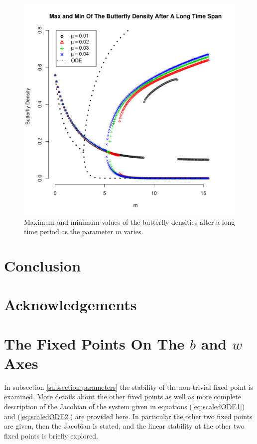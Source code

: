 \documentclass[12pt]{article}
\begin{document}
\begin{figure}[htb]
  \centering
  \includegraphics[width=12cm]{img/maxMinByM-mu-01-04.pdf}
  \caption[Maximum and minimum values of the butterfly
  density]{Maximum and minimum values of the butterfly densities after
    a long time period as the parameter $m$ varies.}
  \label{fig:maxMinButterflySmallMu}
\end{figure}

\section{Conclusion}

\section{Acknowledgements}

\clearpage

\appendix

\section{The Fixed Points On The $b$ and $w$ Axes}
\label{appendix:otherFixedPoints}

In subsection \ref{subsection:parameters} the stability of the
non-trivial fixed point is examined. More details about the other
fixed points as well as more complete description of the Jacobian of
the system given in equations (\ref{eq:scaledODE1}) and
(\ref{eq:scaledODE2}) are provided here. In particular the other two
fixed points are given, then the Jacobian is stated, and the linear
stability at the other two fixed points is briefly explored.
\end{document}
